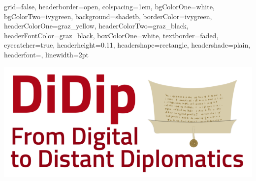 \documentclass[a0paper,portrait]{baposter}
\begin{document}
\begin{poster} %
{
grid=false, %
headerborder=open, %
colspacing=1em, %
bgColorOne=white, %
bgColorTwo=ivygreen, %
background=shadetb, %
borderColor=ivygreen, %
headerColorOne=graz_yellow, %
headerColorTwo=graz_black, %
headerFontColor=graz_black, %
boxColorOne=white, %
textborder=faded, %
eyecatcher=true, %
headerheight=0.11\textheight, %
headershape=rectangle, %
headershade=plain,
headerfont=\Large\textsf, %
linewidth=2pt %
}
{\begin{minipage}{.125\linewidth}
	\includegraphics[width=\linewidth]{didip_sm.png}


\end{minipage}}
\end{poster}
\end{document}
